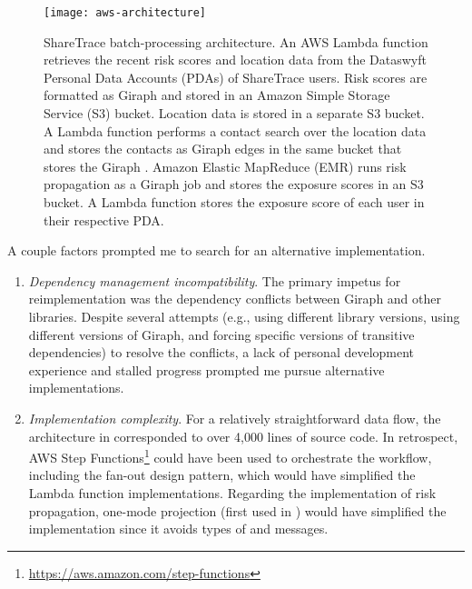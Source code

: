 \begin{figure}[htbp]
\centering
\texttt{[image: aws-architecture]}
\caption[ShareTrace batch-processing architecture]{ShareTrace batch-processing architecture.  An AWS Lambda function\protect\footnotemark{} retrieves the recent risk scores and location data from the Dataswyft Personal Data Accounts (PDAs) of ShareTrace users. Risk scores are formatted as Giraph \verticesName{} and stored in an Amazon Simple Storage Service\protect\footnotemark{} (S3) bucket. Location data is stored in a separate S3 bucket.  A Lambda function performs a contact search over the location data and stores the contacts as Giraph edges in the same bucket that stores the Giraph \verticesName.  Amazon Elastic MapReduce\protect\footnotemark{} (EMR) runs risk propagation as a Giraph job and stores the exposure scores in an S3 bucket.  A Lambda function stores the exposure score of each user in their respective PDA.}
\label{fig:aws-architecture}
\end{figure}

\addtocounter{footnote}{-1}
\addtocounter{footnote}{-1}
\addtocounter{footnote}{1}
\addtocounter{footnote}{1}

\clearpage

A couple factors prompted me to search for an alternative implementation.
  \begin{enumerate}
    \item \emph{Dependency management incompatibility}. The primary impetus for reimplementation was the dependency conflicts between Giraph and other libraries. Despite several attempts (e.g., using different library versions, using different versions of Giraph, and forcing specific versions of transitive dependencies) to resolve the conflicts, a lack of personal development experience and stalled progress prompted me pursue alternative implementations.
    \item \emph{Implementation complexity}. For a relatively straightforward data flow, the architecture in  corresponded to over 4,000 lines of source code. In retrospect, AWS Step Functions\footnote{\url{https://aws.amazon.com/step-functions}} could have been used to orchestrate the workflow, including the fan-out design pattern, which would have simplified the Lambda function implementations. Regarding the implementation of risk propagation, one-mode projection (first used in ) would have simplified the implementation since it avoids types of \verticesName{} and messages.
  \end{enumerate}

